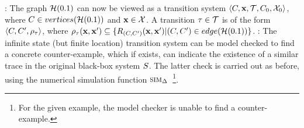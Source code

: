 \begin{example}
: The graph $\mathcal{H}(0.1)$ can now be viewed as a
    transition system $\left\langle C,\mathbf{x},\mathcal{T},C_0,\mathcal{X}_0 \right \rangle$,
    where $C \in vertices(\mathcal{H}(0.1))$ and $\mathbf{x} \in
    \mathcal{X}$. A transition $\tau \in \mathcal{T}$ is of the form
    $\left\langle C, C',\rho_{\tau} \right \rangle$, where $\rho_{\tau}(\mathbf{x},\mathbf{x}')
    \subseteq \{R_{(C,C')}(\mathbf{x},\mathbf{x}') |( C,C') \in
    edge(\mathcal{H}(0.1))\}$.
: The infinite state (but finite location) transition system can
    be model checked to find a concrete counter-example, which if
    exists, can indicate the existence of a similar trace in the
    original black-box system $S$. The latter check is carried
    out as before, using the numerical simulation function
        $\mbox{\sc sim}_\Delta$~\footnote{For the given example, the model checker is unable to
        find a counter-example.}.

\end{example}


%    
